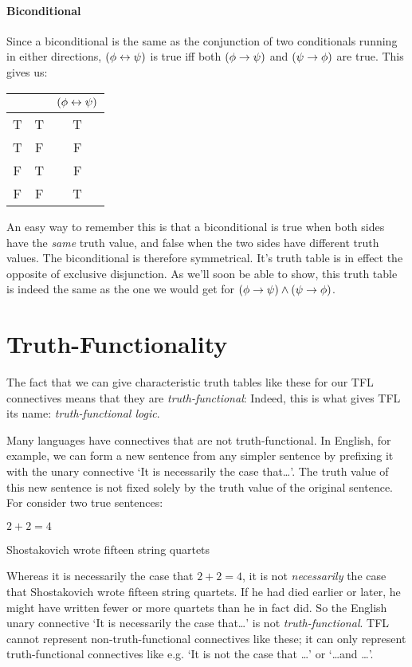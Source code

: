  \paragraph{Biconditional}  Since a biconditional is the same as the conjunction of two conditionals running in either directions, $(\mathcal{\phi} \leftrightarrow \mathcal{\psi})$ is true iff both $(\mathcal{\phi} \rightarrow \mathcal{\psi})$ and $(\mathcal{\psi} \rightarrow \mathcal{\phi})$  are true.  This gives us:


\begin{center}
\begin{tabular}{c c|c}
\meta{\phi} & \meta{\psi} & $(\mathcal{\phi}\leftrightarrow\mathcal{\psi})$\\
\hline
T & T & T\\
T & F & F\\
F & T & F\\
F & F & T
\end{tabular}
\end{center}
An easy way to remember this is that a biconditional is true when both sides have the \emph{same} truth value, and false when the two sides have different truth values.  The biconditional is therefore symmetrical.  It's truth table is in effect the opposite of exclusive disjunction.  As we'll  soon be able to show, this truth table is indeed the same as the one we would get for $(\mathcal{\phi} \rightarrow \mathcal{\psi}) \wedge (\mathcal{\psi} \rightarrow \mathcal{\phi})$.

\section{Truth-Functionality}

The fact that we can give characteristic truth tables like these for our TFL connectives means that they are \emph{truth-functional}:
Indeed, this is what gives TFL its name: \emph{truth-functional logic}.

Many languages have connectives that are not truth-functional. In English, for example, we can form a new sentence from any simpler sentence by prefixing it with the unary connective `It is necessarily the case that\ldots'. The truth value of this new sentence is not fixed solely by the truth value of the original sentence. For consider two true sentences:
	\begin{earg}
		\item $2 + 2 = 4$
		\item Shostakovich wrote fifteen string quartets
	\end{earg}
Whereas it is necessarily the case that $2 + 2 = 4$, it is not \emph{necessarily} the case that Shostakovich wrote fifteen string quartets. If he had died earlier or later, he might have written fewer or more quartets than he in fact did. So the English unary connective `It is necessarily the case that\ldots' is not \emph{truth-functional}.  TFL cannot represent non-truth-functional connectives like these; it can only represent truth-functional connectives like e.g. `It is not the case that \ldots' or `\ldots and \ldots'.


